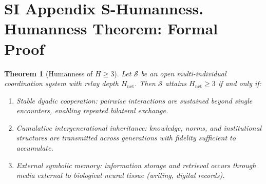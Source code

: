 \documentclass[11pt]{article}
\newtheorem{theorem}{Theorem}
\begin{document}




\section*{SI Appendix S-Humanness. Humanness Theorem: Formal Proof}

\begin{theorem}[Humanness of $H\!\ge\!3$]\label{thm:si_humanness}
Let $\mathcal{S}$ be an open multi-individual coordination system with relay depth $H_{\mathrm{net}}$.
Then $\mathcal{S}$ attains $H_{\mathrm{net}}\ge 3$ if and only if:
\begin{enumerate}
\item[\textbf{C1.}] \emph{Stable dyadic cooperation}: pairwise interactions are sustained beyond single encounters, enabling repeated bilateral exchange.
\item[\textbf{C2.}] \emph{Cumulative intergenerational inheritance}: knowledge, norms, and institutional structures are transmitted across generations with fidelity sufficient to accumulate.
\item[\textbf{C3.}] \emph{External symbolic memory}: information storage and retrieval occurs through media external to biological neural tissue (writing, digital records).
\end{enumerate}
\end{theorem}
\end{document}
